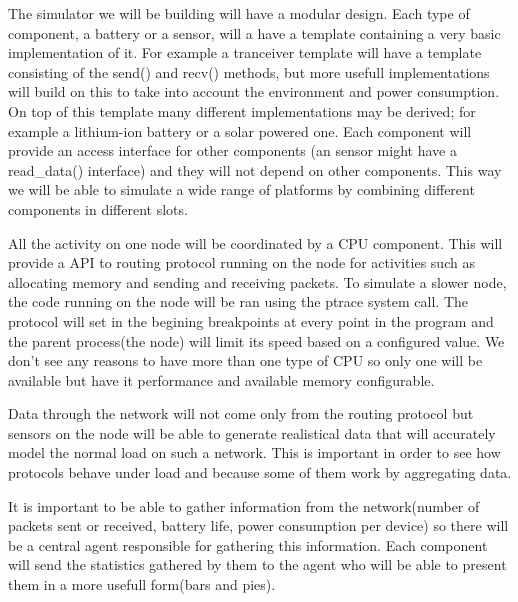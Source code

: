 \label{subsec:architecture}

The simulator we will be building will have a modular design. Each type
of component, a battery or a sensor, will a have a template containing a
very basic implementation of it. For example a tranceiver template will
have a template consisting of the send() and recv() methods, but more
usefull implementations will build on this to take into account the
environment and power consumption. On top of this template many different
implementations may be derived; for example a lithium-ion battery or a solar
powered one. Each component will provide an access interface for other components
(an sensor might have a read_data() interface) and they will not depend on other 
components. This way we will be able to simulate a wide range of platforms by
combining different components in different slots.

All the activity on one node will be coordinated by a CPU component. This will provide
a API to routing protocol running on the node for activities such as allocating memory 
and sending and receiving packets. To simulate a slower node, the code running on the 
node will be ran using the ptrace system call. The protocol will set in the begining
breakpoints at every point in the program and the parent process(the node) will limit
its speed based on a configured value. We don't see any reasons to have more than one
type of CPU so only one will be available but have it performance and available memory
configurable.

Data through the network will not come only from the routing protocol but sensors on the 
node will be able to generate realistical data that will accurately model the normal load
on such a network. This is important in order to see how protocols behave under load and
because some of them work by aggregating data.

It is important to be able to gather information from the network(number of packets sent
or received, battery life, power consumption per device) so there will be a central agent
responsible for gathering this information. Each component will send the statistics gathered
by them to the agent who will be able to present them in a more usefull form(bars and pies).
